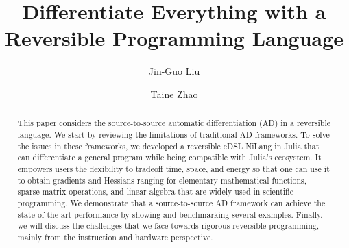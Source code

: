 \documentclass[aps,twocolumn,longbibliography,english,superscriptaddress]{revtex4-1}
\newcommand{\<}{\langle}
\renewcommand{\>}{\rangle}
\theoremstyle{definition}\newtheorem{definition}{\textit{Definition}}
\begin{document}
\title{Differentiate Everything with a Reversible Programming Language}


\author{Jin-Guo Liu}

\author{Taine Zhao}

\begin{abstract}
    This paper considers the source-to-source automatic differentiation (AD) in a reversible language. We start by reviewing the limitations of traditional AD frameworks. To solve the issues in these frameworks, we developed a reversible eDSL NiLang in Julia that can differentiate a general program while being compatible with Julia's ecosystem. It empowers users the flexibility to tradeoff time, space, and energy so that one can use it to obtain gradients and Hessians ranging for elementary mathematical functions, sparse matrix operations, and linear algebra that are widely used in scientific programming. We demonstrate that a source-to-source AD framework can achieve the state-of-the-art performance by showing and benchmarking several examples. Finally, we will discuss the challenges that we face towards rigorous reversible programming, mainly from the instruction and hardware perspective.
\end{abstract}


\maketitle

\end{document}
